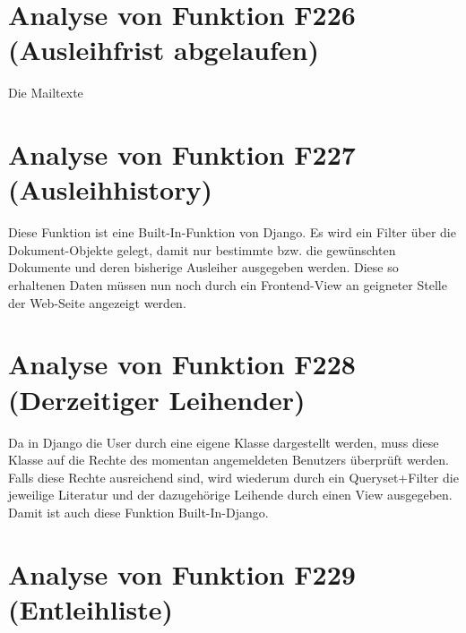 \section{Analyse von Funktion F226 (Ausleihfrist abgelaufen)}
Die Mailtexte 

\section{Analyse von Funktion F227 (Ausleihhistory)}
Diese Funktion ist eine Built-In-Funktion von Django.
Es wird ein Filter über die Dokument-Objekte gelegt, damit nur bestimmte bzw. die gewünschten Dokumente und deren bisherige Ausleiher ausgegeben werden. Diese so erhaltenen Daten müssen nun noch durch ein Frontend-View an geigneter Stelle der Web-Seite angezeigt werden.

\section{Analyse von Funktion F228 (Derzeitiger Leihender)}
Da in Django die User durch eine eigene Klasse dargestellt werden, muss diese Klasse auf die Rechte des momentan angemeldeten Benutzers überprüft werden. Falls diese Rechte ausreichend sind, wird wiederum durch ein Queryset+Filter die jeweilige Literatur und der dazugehörige Leihende durch einen View ausgegeben.
Damit ist auch diese Funktion Built-In-Django.

\section{Analyse von Funktion F229 (Entleihliste)}

